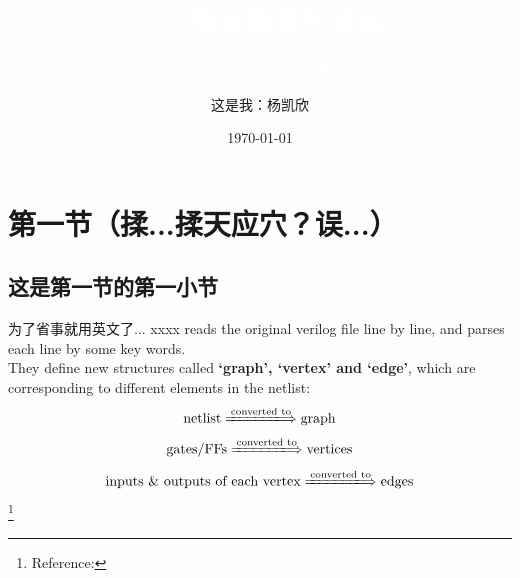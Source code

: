 \documentclass{beamer}
\title{\textcolor{white}{一个简单粗暴的模板}}
\subtitle{\textcolor{white}{一个使用了北大红的简单粗暴的模板}}
\author{这是我：杨凯欣}
\date{\today}
\begin{document}
	
	
	\begin{frame}
	\titlepage
\end{frame}


\begin{frame}
\tableofcontents
\end{frame}


\section{第一节（揉...揉天应穴？误...）}


\subsection{这是第一节的第一小节}
\begin{frame}{为了省事就用英文了...}
xxxx reads the original verilog file line by line, and parses each line by some key words. \\
They define new structures called \textcolor{MyRed}{\bf `graph', `vertex' and `edge'}, which are corresponding to different elements in the netlist:
$$\text{netlist}\xLongrightarrow{\text{converted to}}\text{graph}$$ 
$$\text{gates/FFs}\xLongrightarrow{\text{converted to}}\text{vertices}$$ 
$$\text{inputs \& outputs of each vertex}\xLongrightarrow{\text{converted to}}\text{edges}$$ 
\footnote{\tiny Reference:}
\end{frame}


\end{document}
